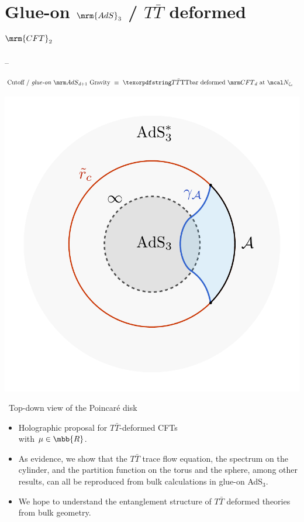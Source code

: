 \documentclass[10pt]{article}
\renewenvironment{frame}[1]%
	{\section*{#1}}%
	{\clearpage}
\newcommand{\pause}{}
\newenvironment{columns}%
	{\par\begin{minipage}{\textwidth}}%
	{\end{minipage}}
\newenvironment{column}[1]%
	{\begin{minipage}{#1}}%
	{\end{minipage}}
\newcommand{\TTbar}{\texorpdfstring{\ensuremath{T\bar{T}}}{TTbar}\xspace}
\begin{document}
\begin{frame}{Glue-on $\mrm{AdS}_3$ / \TTbar deformed $\mrm{CFT}_2$}
\noindent
	\textcite{Apolo:2023vnm} -- 

\begin{equation*}
\stateGlueon
\end{equation*}

\begin{columns}
\begin{column}{.37\textwidth}
	\centering
	\includegraphics[width=\linewidth]{img/RT-AdS.pdf}
	\vspace{-1.5\baselineskip}
	
	\vspace{-.3\baselineskip}
	\scriptsize\, Top-down view of the Poincar\'e disk
\end{column}
\hspace{-1em}
\begin{column}{.65\textwidth}
\begin{itemize}
\item Holographic proposal for $T\bar T$-deformed CFTs\\
with $\mu \in \mbb{R}$.

\item As evidence, we show that the $T\bar T$ trace flow equation, the spectrum on the cylinder, and the partition function on the torus and the sphere, among other results, can all be reproduced from bulk calculations in glue-on AdS$_3$.

\pause
\item We hope to understand the entanglement structure of \TTbar deformed theories from bulk geometry. 
\end{itemize}
\end{column}
\end{columns}
\end{frame}
\end{document}
